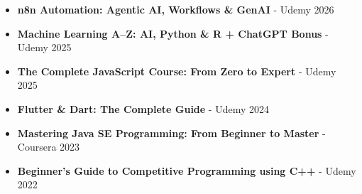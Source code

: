 \begin{itemize}[leftmargin=*, itemsep=0pt, topsep=2pt, parsep=0pt]
  \item \textbf{n8n Automation: Agentic AI, Workflows \& GenAI} - Udemy \hfill 2026
  \item \textbf{Machine Learning A–Z\texttrademark: AI, Python \& R + ChatGPT Bonus} - Udemy \hfill 2025
  \item \textbf{The Complete JavaScript Course: From Zero to Expert} - Udemy \hfill 2025
  \item \textbf{Flutter \& Dart: The Complete Guide} - Udemy \hfill 2024
  \item \textbf{Mastering Java SE Programming: From Beginner to Master} - Coursera \hfill 2023
  \item \textbf{Beginner’s Guide to Competitive Programming using C++} - Udemy \hfill 2022
\end{itemize}